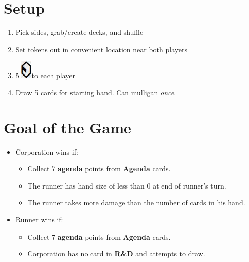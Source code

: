 \documentclass[12pt]{article}
\newenvironment{enumerateCustom}
{\begin{enumerate}
  \setlength{\itemsep}{1pt}
  \setlength{\parskip}{0pt}
  \setlength{\parsep}{0pt}}
{\end{enumerate}}
\newenvironment{itemizeCustom}
{\begin{itemize}
  \setlength{\itemsep}{1pt}
  \setlength{\parskip}{0pt}
  \setlength{\parsep}{0pt}}
{\end{itemize}}
\newcommand{\credit}{\includegraphics[scale=0.40]{images/creditLarge.jpg}\hspace{0.3em}}
\begin{document}
\begin{multicols*}{2}

\section*{Setup}
\begin{enumerateCustom}
	\item Pick sides, grab/create decks, and shuffle
	\item Set tokens out in convenient location near both players
	\item 5 \credit to each player
	\item Draw 5 cards for starting hand. Can mulligan \emph{once}.
\end{enumerateCustom}

\section*{Goal of the Game}
\begin{itemizeCustom}
	\item Corporation wins if:
		\begin{itemizeCustom}
			\item Collect 7 \textbf{agenda} points from \textbf{Agenda} cards.
			\item The runner has hand size of less than 0 at end of runner's turn.
			\item The runner takes more damage than the number of cards in his hand.
		\end{itemizeCustom}
	\item Runner wins if:
		\begin{itemizeCustom}
			\item Collect 7 \textbf{agenda} points from \textbf{Agenda} cards.
			\item Corporation has no card in \textbf{R\&D} and attempts to draw.
		\end{itemizeCustom}
\end{itemizeCustom}


\end{multicols*}
\end{document}
